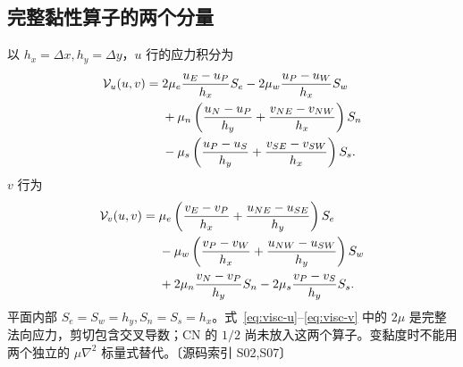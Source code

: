 \documentclass[UTF8,a4paper,11pt,fontset=fandol]{ctexart}
\newcommand{\src}[1]{\textcolor{ink}{\small〔源码索引 #1〕}}
\begin{document}
\subsection{完整黏性算子的两个分量}
以 $h_x=\Delta x,h_y=\Delta y$，$u$ 行的应力积分为
\begin{align}
 \mathcal V_u(u,v)={}&2\mu_e\frac{u_E-u_P}{h_x}S_e
                  -2\mu_w\frac{u_P-u_W}{h_x}S_w\notag\\
 &+\mu_n\left(\frac{u_N-u_P}{h_y}+\frac{v_{NE}-v_{NW}}{h_x}\right)S_n\notag\\
 &-\mu_s\left(\frac{u_P-u_S}{h_y}+\frac{v_{SE}-v_{SW}}{h_x}\right)S_s.
 \label{eq:visc-u}
\end{align}
$v$ 行为
\begin{align}
 \mathcal V_v(u,v)={}&\mu_e\left(\frac{v_E-v_P}{h_x}+\frac{u_{NE}-u_{SE}}{h_y}\right)S_e\notag\\
 &-\mu_w\left(\frac{v_P-v_W}{h_x}+\frac{u_{NW}-u_{SW}}{h_y}\right)S_w\notag\\
 &+2\mu_n\frac{v_N-v_P}{h_y}S_n-2\mu_s\frac{v_P-v_S}{h_y}S_s.
 \label{eq:visc-v}
\end{align}
平面内部 $S_e=S_w=h_y,S_n=S_s=h_x$。式~\eqref{eq:visc-u}--\eqref{eq:visc-v} 中的 $2\mu$ 是完整法向应力，剪切包含交叉导数；CN 的 $1/2$ 尚未放入这两个算子。变黏度时不能用两个独立的 $\mu\nabla^2$ 标量式替代。\src{S02,S07}
\end{document}
